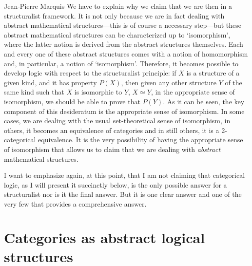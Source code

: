 \begin{artengenv}{Jean-Pierre Marquis}
We have to explain why we claim that we are then in a structuralist framework. It is not only because we are in fact dealing with abstract mathematical structures---this is of course a necessary step---but these abstract mathematical structures can be characterized up to `isomorphism', where the latter notion is derived from the abstract structures themselves. Each and every one of these abstract structures comes with a notion of homomorphism and, in particular, a notion of `isomorphism'. Therefore, it becomes possible to develop logic with respect to the structuralist principle: if $X$ is a structure of a given kind, and it has property $P(X)$, then given any other structure $Y$ of the same kind such that $X$ is isomorphic to $Y$, $X \simeq Y$, in the appropriate sense of isomorphism, we should be able to prove that $P(Y)$. As it can be seen, the key component of this desideratum is the appropriate sense of isomorphism. In some cases, we are dealing with the usual set-theoretical sense of isomorphism, in others, it becomes an equivalence of categories and in still others, it is a 2-categorical equivalence. It is the very possibility of having the appropriate sense of isomorphism that allows us to claim that we are dealing with \emph{abstract} mathematical structures. 

I want to emphasize again, at this point, that I am not claiming that categorical logic, as I will present it succinctly below, is the only possible answer for a structuralist nor is it the final answer. But it is one clear answer and one of the very few that provides a comprehensive answer. 

\section{Categories as abstract logical structures}


\end{artengenv}
